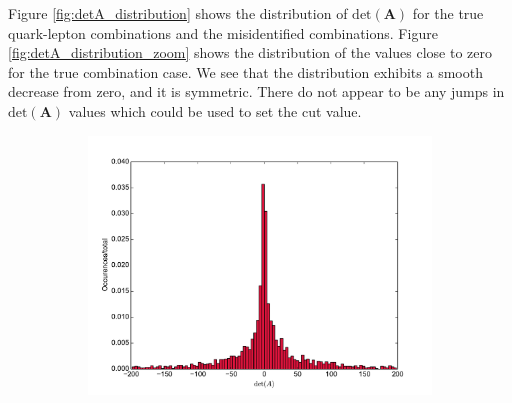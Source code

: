 \documentclass[twoside,english]{uiofysmaster}
\begin{document}
Figure \ref{fig:detA_distribution} shows the distribution of $\mathrm{det}(\mathbf{A})$ for the true quark-lepton combinations and the misidentified combinations. Figure \ref{fig:detA_distribution_zoom} shows the distribution of the values close to zero for the true combination case. We see that the distribution exhibits a smooth decrease from zero, and it is symmetric. There do not appear to be any jumps in $\mathrm{det}(\mathbf{A})$ values which could be used to set the cut value.
\begin{figure}[hbt]
	\centering
	\begin{subfigure}[b]{0.6\textwidth}
		\includegraphics[width=\textwidth]{figures/improving_combinatorics/histogram_detA_truecombo_herwigpp-nosmear.pdf} 
		\caption{ }
		\label{fig:detA_distribution_a}
	\end{subfigure}


\end{figure}
\end{document}
